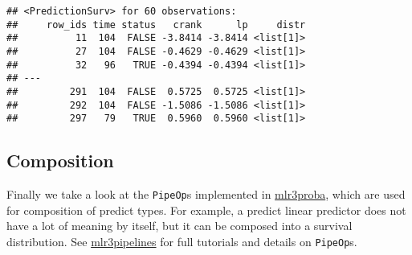 \documentclass[
]{scrbook}
\newenvironment{Shaded}{\begin{snugshade}}{\end{snugshade}}
\newcommand{\AttributeTok}[1]{\textcolor[rgb]{0.77,0.63,0.00}{#1}}
\newcommand{\FloatTok}[1]{\textcolor[rgb]{0.00,0.00,0.81}{#1}}
\newcommand{\FunctionTok}[1]{\textcolor[rgb]{0.00,0.00,0.00}{#1}}
\newcommand{\NormalTok}[1]{#1}
\newcommand{\OtherTok}[1]{\textcolor[rgb]{0.56,0.35,0.01}{#1}}
\newcommand{\SpecialCharTok}[1]{\textcolor[rgb]{0.00,0.00,0.00}{#1}}
\newcommand{\StringTok}[1]{\textcolor[rgb]{0.31,0.60,0.02}{#1}}
\renewenvironment{Shaded} {\begin{snugshade}\small} {\end{snugshade}}
\begin{document}
\begin{Shaded}
\end{Shaded}

\begin{verbatim}
## <PredictionSurv> for 60 observations:
##     row_ids time status   crank      lp     distr
##          11  104  FALSE -3.8414 -3.8414 <list[1]>
##          27  104  FALSE -0.4629 -0.4629 <list[1]>
##          32   96   TRUE -0.4394 -0.4394 <list[1]>
## ---                                              
##         291  104  FALSE  0.5725  0.5725 <list[1]>
##         292  104  FALSE -1.5086 -1.5086 <list[1]>
##         297   79   TRUE  0.5960  0.5960 <list[1]>
\end{verbatim}

\hypertarget{composition}{%
\subsection{Composition}\label{composition}}

Finally we take a look at the \texttt{PipeOp}s implemented in \href{https://mlr3proba.mlr-org.com}{mlr3proba}, which are used for composition of predict types.
For example, a predict linear predictor does not have a lot of meaning by itself, but it can be composed into a survival distribution.
See \href{https://mlr3pipelines.mlr-org.com}{mlr3pipelines} for full tutorials and details on \texttt{PipeOp}s.
\end{document}
